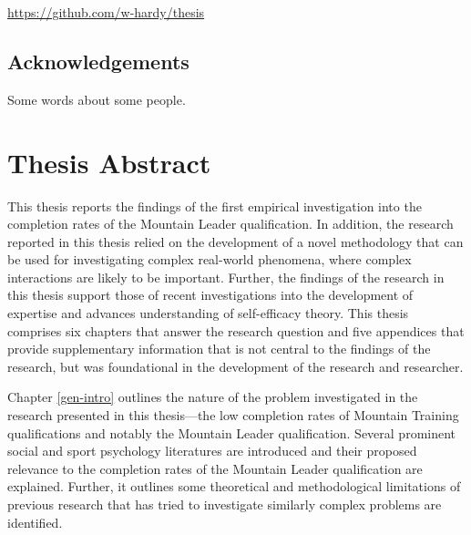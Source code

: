 \documentclass[
  12pt,
  a4paper,
]{book}
\begin{document}
\url{https://github.com/w-hardy/thesis}

\section*{Acknowledgements}

Some words about some people.

{
\setcounter{tocdepth}{2}
\tableofcontents
}
\listoftables
{}

\listoffigures
{}

\mainmatter
\setcounter{page}{1}

\hypertarget{thesis-abstract}{%
\chapter*{Thesis Abstract}\label{thesis-abstract}}

This thesis reports the findings of the first empirical investigation into the completion rates of the Mountain Leader qualification. In addition, the research reported in this thesis relied on the development of a novel methodology that can be used for investigating complex real-world phenomena, where complex interactions are likely to be important. Further, the findings of the research in this thesis support those of recent investigations into the development of expertise and advances understanding of self-efficacy theory. This thesis comprises six chapters that answer the research question and five appendices that provide supplementary information that is not central to the findings of the research, but was foundational in the development of the research and researcher.

Chapter \ref{gen-intro} outlines the nature of the problem investigated in the research presented in this thesis---the low completion rates of Mountain Training qualifications and notably the Mountain Leader qualification. Several prominent social and sport psychology literatures are introduced and their proposed relevance to the completion rates of the Mountain Leader qualification are explained. Further, it outlines some theoretical and methodological limitations of previous research that has tried to investigate similarly complex problems are identified.
\end{document}

